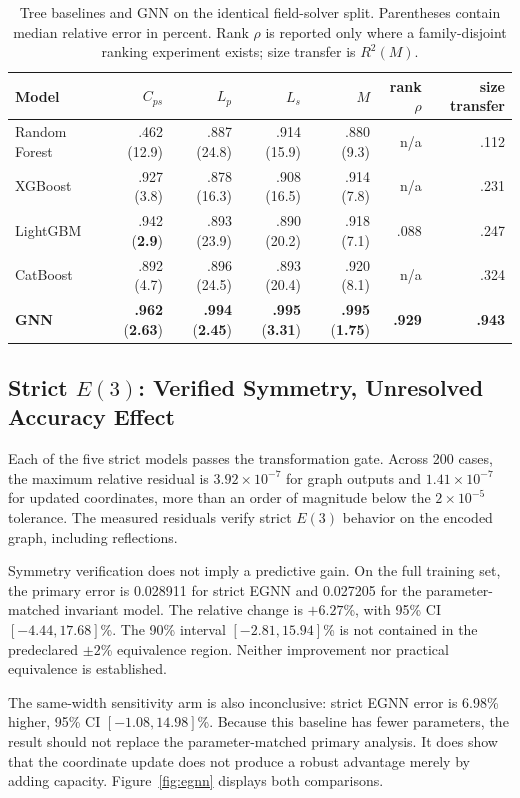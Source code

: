 \documentclass[letterpaper,twocolumn,9pt]{extarticle}
\newcommand{\Cps}{C_{ps}}
\newcommand{\Lp}{L_p}
\newcommand{\Ls}{L_s}
\newcommand{\Mut}{M}
\begin{document}
\begin{table}[t]
\caption{Tree baselines and GNN on the identical field-solver split. Parentheses contain median relative error in percent. Rank $\rho$ is reported only where a family-disjoint ranking experiment exists; size transfer is $R^2(\Mut)$.}
\label{tab:trees}
\centering
\small
\setlength{\tabcolsep}{6pt}
\begin{tabular}{lrrrrrr}
\toprule
Model & $\Cps$ & $\Lp$ & $\Ls$ & $\Mut$ & rank $\rho$ & size transfer\\
\midrule
Random Forest & .462 (12.9) & .887 (24.8) & .914 (15.9) & .880 (9.3) & n/a & .112\\
XGBoost & .927 (3.8) & .878 (16.3) & .908 (16.5) & .914 (7.8) & n/a & .231\\
LightGBM & .942 (\textbf{2.9}) & .893 (23.9) & .890 (20.2) & .918 (7.1) & .088 & .247\\
CatBoost & .892 (4.7) & .896 (24.5) & .893 (20.4) & .920 (8.1) & n/a & .324\\
\textbf{GNN} & \textbf{.962} (\textbf{2.63}) & \textbf{.994} (\textbf{2.45}) & \textbf{.995} (\textbf{3.31}) & \textbf{.995} (\textbf{1.75}) & \textbf{.929} & \textbf{.943}\\
\bottomrule
\end{tabular}
\end{table}

\subsection{Strict $E(3)$: Verified Symmetry, Unresolved Accuracy Effect}
Each of the five strict models passes the transformation gate. Across 200 cases, the maximum relative residual is $3.92\times10^{-7}$ for graph outputs and $1.41\times10^{-7}$ for updated coordinates, more than an order of magnitude below the $2\times10^{-5}$ tolerance. The measured residuals verify strict $E(3)$ behavior on the encoded graph, including reflections.

Symmetry verification does not imply a predictive gain. On the full training set, the primary error is 0.028911 for strict EGNN and 0.027205 for the parameter-matched invariant model. The relative change is $+6.27$\%, with 95\% CI $[-4.44,17.68]$\%. The 90\% interval $[-2.81,15.94]$\% is not contained in the predeclared $\pm2$\% equivalence region. Neither improvement nor practical equivalence is established.

The same-width sensitivity arm is also inconclusive: strict EGNN error is 6.98\% higher, 95\% CI $[-1.08,14.98]$\%. Because this baseline has fewer parameters, the result should not replace the parameter-matched primary analysis. It does show that the coordinate update does not produce a robust advantage merely by adding capacity. Figure~\ref{fig:egnn} displays both comparisons.
\end{document}
